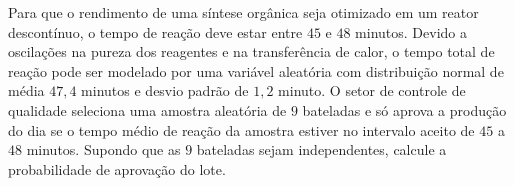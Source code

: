 %
%


\begin{exercicioBanco}[\valorquestao]
Para que o rendimento de uma síntese orgânica seja otimizado em um reator descontínuo, o tempo de reação deve estar entre $45$ e $48$ minutos. Devido a oscilações na pureza dos reagentes e na transferência de calor, o tempo total de reação pode ser modelado por uma variável aleatória com distribuição normal de média $47{,}4$ minutos e desvio padrão de $1{,}2$ minuto. O setor de controle de qualidade seleciona uma amostra aleatória de $9$ bateladas e só aprova a produção do dia se o tempo médio de reação da amostra estiver no intervalo aceito de $45$ a $48$ minutos. Supondo que as $9$ bateladas sejam independentes, calcule a probabilidade de aprovação do lote.
\end{exercicioBanco}

